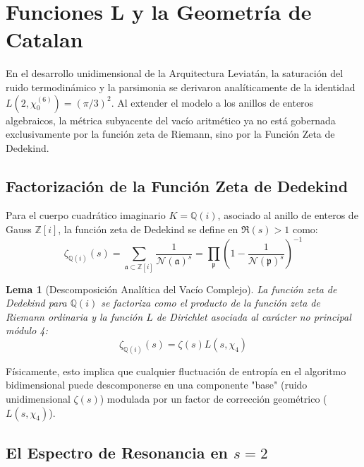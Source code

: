 \documentclass[12pt, a4paper]{article}
\theoremstyle{plain}
\newtheorem{lema}[teorema]{Lema}
\theoremstyle{definition}
\theoremstyle{remark}
\newcommand{\Z}{\mathbb{Z}}
\newcommand{\Q}{\mathbb{Q}}
\newcommand{\Norm}{\mathcal{N}}
\begin{document}
\section{Funciones L y la Geometría de Catalan}
\label{sec:funciones_L}

En el desarrollo unidimensional de la Arquitectura Leviatán, la saturación del ruido termodinámico y la parsimonia se derivaron analíticamente de la identidad $L(2, \chi_0^{(6)}) = (\pi/3)^2$. Al extender el modelo a los anillos de enteros algebraicos, la métrica subyacente del vacío aritmético ya no está gobernada exclusivamente por la función zeta de Riemann, sino por la Función Zeta de Dedekind.

\subsection{Factorización de la Función Zeta de Dedekind}

Para el cuerpo cuadrático imaginario $K = \Q(i)$, asociado al anillo de enteros de Gauss $\Z[i]$, la función zeta de Dedekind se define en $\Re(s) > 1$ como:
\begin{equation}
    \zeta_{\Q(i)}(s) = \sum_{\mathfrak{a} \subset \Z[i]} \frac{1}{\Norm(\mathfrak{a})^s} = \prod_{\mathfrak{p}} \left( 1 - \frac{1}{\Norm(\mathfrak{p})^s} \right)^{-1}
\end{equation}

\begin{lema}[Descomposición Analítica del Vacío Complejo]
La función zeta de Dedekind para $\Q(i)$ se factoriza como el producto de la función zeta de Riemann ordinaria y la función $L$ de Dirichlet asociada al carácter no principal módulo 4:
\begin{equation}
    \zeta_{\Q(i)}(s) = \zeta(s) L(s, \chi_4)
\end{equation}
\end{lema}

Físicamente, esto implica que cualquier fluctuación de entropía en el algoritmo bidimensional puede descomponerse en una componente "base" (ruido unidimensional $\zeta(s)$) modulada por un factor de corrección geométrico ($L(s, \chi_4)$).

\subsection{El Espectro de Resonancia en \texorpdfstring{$s=2$}{s=2}}
\end{document}
